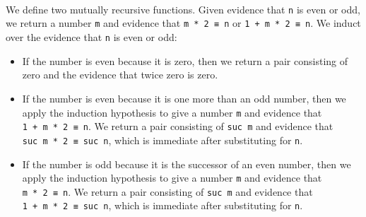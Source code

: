 \begin{fence}
\begin{code}
\AgdaSpace{}%
\AgdaOperator{\AgdaInductiveConstructor{,}}\AgdaSpace{}%
\AgdaSpace{}%
\<%
\\
%
\\[\AgdaEmptyExtraSkip]%
\>[0]%
\>[7]\AgdaSymbol{(}\AgdaSpace{}%
\AgdaSymbol{)}%
\>[20]\AgdaSpace{}%
\AgdaSpace{}%
\<%
\\
\>[0]%
\>[23]\AgdaSymbol{|}\AgdaSpace{}%
\AgdaSpace{}%
\AgdaSpace{}%
\AgdaOperator{\AgdaInductiveConstructor{,}}\AgdaSpace{}%
\AgdaSpace{}%
%
\>[39]\AgdaSymbol{=}%
\>[42]\AgdaSpace{}%
\AgdaSpace{}%
\AgdaOperator{\AgdaInductiveConstructor{,}}\AgdaSpace{}%
\AgdaSpace{}%
\<%
\end{code}
\end{fence}

We define two mutually recursive functions. Given evidence that
\texttt{n} is even or odd, we return a number \texttt{m} and evidence
that \texttt{m\ *\ 2\ ≡\ n} or \texttt{1\ +\ m\ *\ 2\ ≡\ n}. We induct
over the evidence that \texttt{n} is even or odd:

\begin{itemize}
\item
  If the number is even because it is zero, then we return a pair
  consisting of zero and the evidence that twice zero is zero.
\item
  If the number is even because it is one more than an odd number, then
  we apply the induction hypothesis to give a number \texttt{m} and
  evidence that \texttt{1\ +\ m\ *\ 2\ ≡\ n}. We return a pair
  consisting of \texttt{suc\ m} and evidence that
  \texttt{suc\ m\ *\ 2\ ≡\ suc\ n}, which is immediate after
  substituting for \texttt{n}.
\item
  If the number is odd because it is the successor of an even number,
  then we apply the induction hypothesis to give a number \texttt{m} and
  evidence that \texttt{m\ *\ 2\ ≡\ n}. We return a pair consisting of
  \texttt{suc\ m} and evidence that \texttt{1\ +\ m\ *\ 2\ ≡\ suc\ n},
  which is immediate after substituting for \texttt{n}.
\end{itemize}

